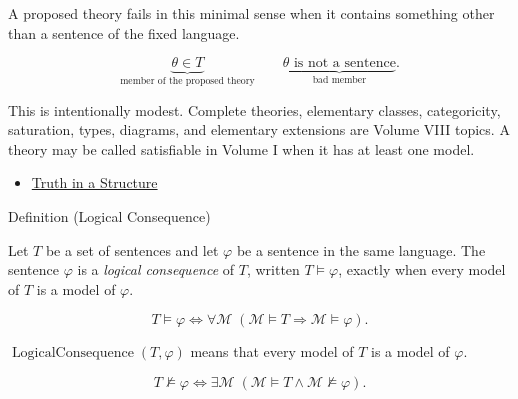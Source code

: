 \begin{remark*}
A proposed theory fails in this minimal sense when it contains something other
than a sentence of the fixed language.
\end{remark*}

\begin{remark*}
\[
\underbrace{\theta\in T}_{\text{member of the proposed theory}}
\qquad
\underbrace{\theta \text{ is not a sentence}}_{\text{bad member}}.
\]
\end{remark*}

\begin{remark*}[Interpretation]
This is intentionally modest. Complete theories, elementary classes,
categoricity, saturation, types, diagrams, and elementary extensions are
Volume VIII topics. A theory may be called satisfiable in Volume I when it has
at least one model.
\end{remark*}

\begin{dependencies}
\begin{itemize}
  \item \hyperref[def:truth-structure]{Truth in a Structure}
\end{itemize}
\end{dependencies}

\begin{definitionbox}{Definition (Logical Consequence)}
\begin{definition}
\label{def:log-consequence}
Let \(T\) be a set of sentences and let \(\varphi\) be a sentence in the same
language. The sentence \(\varphi\) is a \emph{logical consequence} of \(T\),
written \(T\models\varphi\), exactly when every model of \(T\) is a model of
\(\varphi\).
\end{definition}
\end{definitionbox}

\begin{remark*}
\[
T\models\varphi
\Longleftrightarrow
\forall \mathcal M\;(\mathcal M\models T \Rightarrow \mathcal M\models\varphi).
\]
\end{remark*}

\begin{remark*}
\(\operatorname{LogicalConsequence}(T,\varphi)\) means that every model of
\(T\) is a model of \(\varphi\).
\end{remark*}

\begin{remark*}
\[
T\not\models\varphi
\Longleftrightarrow
\exists \mathcal M\;(\mathcal M\models T \land \mathcal M\not\models\varphi).
\]
\end{remark*}

